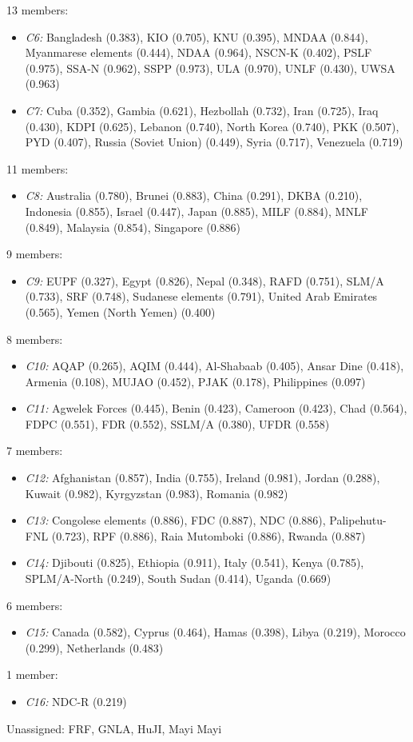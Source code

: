 13 members:
\begin{itemize}[noitemsep, topsep=0pt]
    \item \textit{C6:} Bangladesh (0.383), KIO (0.705), KNU (0.395), MNDAA (0.844), Myanmarese elements (0.444), NDAA (0.964), NSCN-K (0.402), PSLF (0.975), SSA-N (0.962), SSPP (0.973), ULA (0.970), UNLF (0.430), UWSA (0.963)
    \item \textit{C7:} Cuba (0.352), Gambia (0.621), Hezbollah (0.732), Iran (0.725), Iraq (0.430), KDPI (0.625), Lebanon (0.740), North Korea (0.740), PKK (0.507), PYD (0.407), Russia (Soviet Union) (0.449), Syria (0.717), Venezuela (0.719)
\end{itemize}
11 members:
\begin{itemize}[noitemsep, topsep=0pt]
    \item \textit{C8:} Australia (0.780), Brunei (0.883), China (0.291), DKBA (0.210), Indonesia (0.855), Israel (0.447), Japan (0.885), MILF (0.884), MNLF (0.849), Malaysia (0.854), Singapore (0.886)
\end{itemize}
9 members:
\begin{itemize}[noitemsep, topsep=0pt]
    \item \textit{C9:} EUPF (0.327), Egypt (0.826), Nepal (0.348), RAFD (0.751), SLM/A (0.733), SRF (0.748), Sudanese elements (0.791), United Arab Emirates (0.565), Yemen (North Yemen) (0.400)
\end{itemize}
8 members:
\begin{itemize}[noitemsep, topsep=0pt]
    \item \textit{C10:} AQAP (0.265), AQIM (0.444), Al-Shabaab (0.405), Ansar Dine (0.418), Armenia (0.108), MUJAO (0.452), PJAK (0.178), Philippines (0.097)
    \item \textit{C11:} Agwelek Forces (0.445), Benin (0.423), Cameroon (0.423), Chad (0.564), FDPC (0.551), FDR (0.552), SSLM/A (0.380), UFDR (0.558)
\end{itemize}
7 members:
\begin{itemize}[noitemsep, topsep=0pt]
    \item \textit{C12:} Afghanistan (0.857), India (0.755), Ireland (0.981), Jordan (0.288), Kuwait (0.982), Kyrgyzstan (0.983), Romania (0.982)
    \item \textit{C13:} Congolese elements (0.886), FDC (0.887), NDC (0.886), Palipehutu-FNL (0.723), RPF (0.886), Raia Mutomboki (0.886), Rwanda (0.887)
    \item \textit{C14:} Djibouti (0.825), Ethiopia (0.911), Italy (0.541), Kenya (0.785), SPLM/A-North (0.249), South Sudan (0.414), Uganda (0.669)
\end{itemize}
6 members:
\begin{itemize}[noitemsep, topsep=0pt]
    \item \textit{C15:} Canada (0.582), Cyprus (0.464), Hamas (0.398), Libya (0.219), Morocco (0.299), Netherlands (0.483)
\end{itemize}
1 member:
\begin{itemize}[noitemsep, topsep=0pt]
    \item \textit{C16:} NDC-R (0.219)
\end{itemize}
Unassigned: FRF, GNLA, HuJI, Mayi Mayi\\

